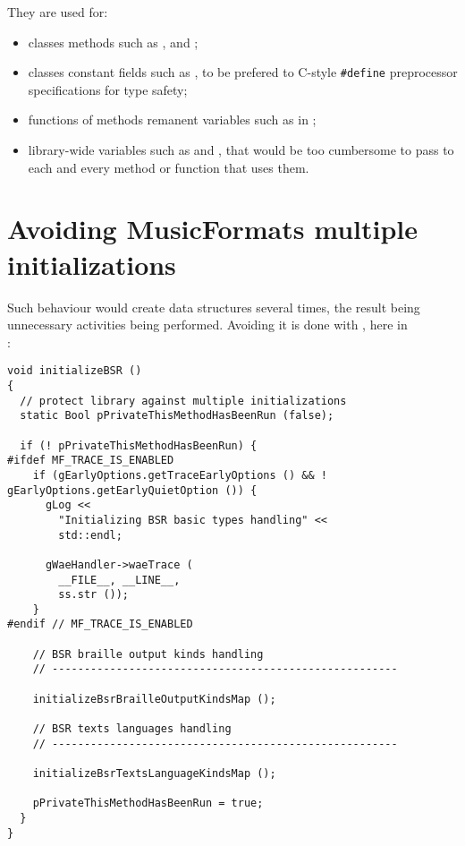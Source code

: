 They are used for:
\begin{itemize}
\item classes methods such as ,  and ;

\item classes constant fields such as , to be prefered to C-style {\tt \#define} preprocessor specifications for type safety;

\item functions of methods remanent variables such as  in ;

\item library-wide variables such as  and , that would be too cumbersome to pass to each and every method or function that uses them.
\end{itemize}


\section{Avoiding MusicFormats multiple initializations}

Such behaviour would create data structures several times, the result being unnecessary activities being performed. Avoiding it is done with , here in \\
:
\begin{lstlisting}[language=CPlusPlus]
void initializeBSR ()
{
  // protect library against multiple initializations
  static Bool pPrivateThisMethodHasBeenRun (false);

  if (! pPrivateThisMethodHasBeenRun) {
#ifdef MF_TRACE_IS_ENABLED
    if (gEarlyOptions.getTraceEarlyOptions () && ! gEarlyOptions.getEarlyQuietOption ()) {
      gLog <<
        "Initializing BSR basic types handling" <<
        std::endl;

      gWaeHandler->waeTrace (
        __FILE__, __LINE__,
        ss.str ());
    }
#endif // MF_TRACE_IS_ENABLED

    // BSR braille output kinds handling
    // ------------------------------------------------------

    initializeBsrBrailleOutputKindsMap ();

    // BSR texts languages handling
    // ------------------------------------------------------

    initializeBsrTextsLanguageKindsMap ();

    pPrivateThisMethodHasBeenRun = true;
  }
}
\end{lstlisting}


